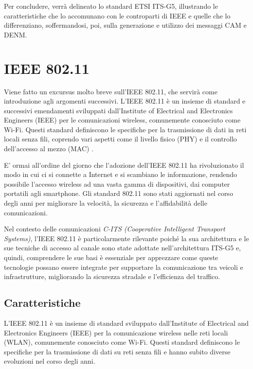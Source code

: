 Per concludere, verrà delineato lo standard ETSI ITS-G5, illustrando le caratteristiche che lo accomunano con le controparti di IEEE e quelle che lo differenziano, soffermandosi, poi, sulla generazione e utilizzo dei messaggi CAM e DENM.

\section{IEEE 802.11}
Viene fatto un excursus molto breve sull'IEEE 802.11, che servirà come introduzione agli argomenti successivi. L'IEEE 802.11 è un insieme di standard e successivi emendamenti sviluppati dall'Institute of Electrical and Electronics Engineers (IEEE) per le comunicazioni wireless, comunemente conosciuto come Wi-Fi. Questi standard definiscono le specifiche per la trasmissione di dati in reti locali senza fili, coprendo vari aspetti come il livello fisico (PHY) e il controllo dell'accesso al mezzo (MAC) \cite{ieee80211}.

E' ormai all'ordine del giorno che l'adozione dell'IEEE 802.11 ha rivoluzionato il modo in cui ci si connette a Internet e si scambiano le informazione, rendendo possibile l'accesso wireless ad una vasta gamma di dispositivi, dai computer portatili agli smartphone. Gli standard 802.11 sono stati aggiornati nel corso degli anni per migliorare la velocità, la sicurezza e l'affidabilità delle comunicazioni.

Nel contesto delle comunicazioni \textit{C-ITS (Cooperative Intelligent Transport Systems)}, l'IEEE 802.11 è particolarmente rilevante poiché la sua architettura e le sue tecniche di accesso al canale sono state adottate nell'architettura ITS-G5 \cite{etsi302} e, quindi, comprendere le sue basi è essenziale per apprezzare come queste tecnologie possano essere integrate per supportare la comunicazione tra veicoli e infrastrutture, migliorando la sicurezza stradale e l'efficienza del traffico.

\subsection[Caratteristiche]{Caratteristiche}
L'IEEE 802.11 è un insieme di standard sviluppato dall'Institute of Electrical and Electronics Engineers (IEEE) per la comunicazione wireless nelle reti locali (WLAN), comunemente conosciuto come Wi-Fi. Questi standard definiscono le specifiche per la trasmissione di dati su reti senza fili e hanno subito diverse evoluzioni nel corso degli anni.

